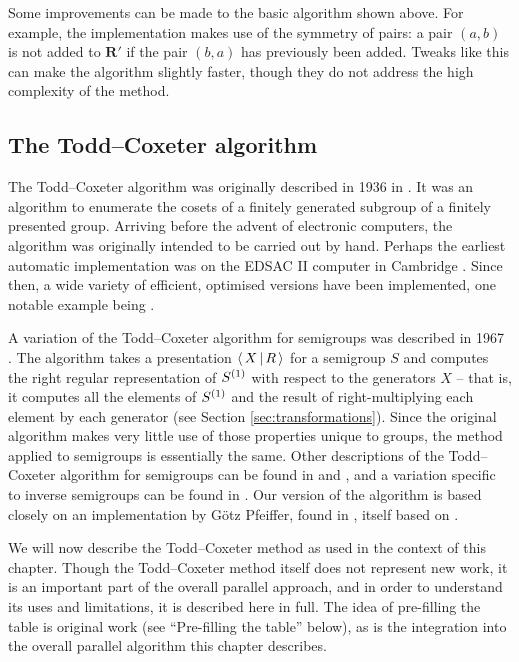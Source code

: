 Some improvements can be made to the basic algorithm shown above.  For example,
the \libsemigroups{} implementation makes use of the symmetry of pairs: a
pair $(a,b)$ is not added to $\mathbf{R}'$ if the pair $(b,a)$ has previously
been added.  Tweaks like this can make the algorithm slightly faster, though
they do not address the high complexity of the method.

\subsection{The Todd--Coxeter algorithm}
\label{sec:tc}

The Todd--Coxeter algorithm was originally described in 1936 in
\cite{todd_coxeter_1936}.  It was an algorithm to enumerate the cosets of a
finitely generated subgroup of a finitely presented group.  Arriving before the
advent of electronic computers, the algorithm was originally intended to be
carried out by hand.  Perhaps the earliest automatic implementation was on the
EDSAC II computer in Cambridge \cite{leech_1963}.  Since then, a wide variety of
efficient, optimised versions have been implemented, one notable example being
\ACE{} \cite{ace}.

A variation of the Todd--Coxeter algorithm for semigroups was described in 1967
\cite{neumann_1967}.  The algorithm takes a presentation $\left\langle \, X \, \middle| \, R \, \right\rangle$
for a semigroup $S$ and computes the right regular representation of $S^{(1)}{}$ with
respect to the generators $X$ -- that is, it computes all the elements of $S^{(1)}{}$ and
the result of right-multiplying each element by each generator (see Section
\ref{sec:transformations}).  Since the
original algorithm makes very little use of those properties unique to groups,
the method applied to semigroups is essentially the same.  Other descriptions of
the Todd--Coxeter algorithm for semigroups can be found in \cite[Chapter 12]{ruskuc_thesis} and
\cite[Chapter 1.2]{walker_thesis}, and a variation specific to inverse
semigroups can be found in \cite{cutting_thesis}.  Our version of the algorithm
is based closely on an implementation by G\"otz Pfeiffer, found in
\cite[\texttt{lib/tcsemi.gi}]{gap}, itself based on \cite{walker_thesis}.

We will now describe the Todd--Coxeter method as used in the context of this
chapter.  Though the Todd--Coxeter method itself does not represent new work, it is an
important part of the overall parallel approach, and in order to understand its
uses and limitations, it is described here in full.
The idea of pre-filling the table is original work (see ``Pre-filling the
table'' below), as is the integration into the overall parallel algorithm this
chapter describes.

